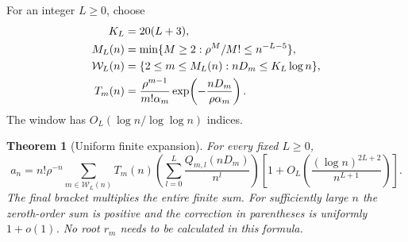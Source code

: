 \documentclass[11pt]{article}
\newtheorem{theorem}{Theorem}[section]
\theoremstyle{remark}\newtheorem{remark}[theorem]{Remark}
\begin{document}
For an integer $L\geq0$, choose
\begin{align}
 K_L&=20(L+3),\notag\\
 M_L(n)&=\min\{M\geq2:\rho^M/M!\leq n^{-L-5}\},\label{fbm:eq:cutoffs}\\
 \mathcal W_L(n)&=\{2\leq m\leq M_L(n):nD_m\leq K_L\log n\},\notag\\
 T_m(n)&=\frac{\rho^{m-1}}{m!\alpha_m}
             \exp\!\left(-\frac{nD_m}{\rho\alpha_m}\right).\label{fbm:eq:T}
\end{align}
The window has $O_L(\log n/\log\log n)$ indices.

\begin{theorem}[Uniform finite expansion]\label{fbm:thm:expansion}
For every fixed $L\geq0$,
\begin{equation}\label{fbm:eq:allorders}
 a_n=n!\rho^{-n}
 \sum_{m\in\mathcal W_L(n)}T_m(n)
 \left(\sum_{l=0}^L\frac{Q_{m,l}(nD_m)}{n^l}\right)
 \left[1+O_L\!\left(\frac{(\log n)^{2L+2}}{n^{L+1}}\right)\right].
\end{equation}
The final bracket multiplies the entire finite sum. For sufficiently large $n$ the zeroth-order sum is positive and the correction in parentheses is uniformly $1+o(1)$. No root $r_m$ needs to be calculated in this formula.
\end{theorem}
\end{document}
